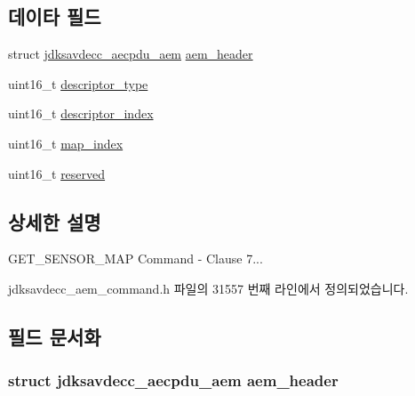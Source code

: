 \subsection*{데이타 필드}
\begin{DoxyCompactItemize}
\item 
struct \hyperlink{structjdksavdecc__aecpdu__aem}{jdksavdecc\+\_\+aecpdu\+\_\+aem} \hyperlink{structjdksavdecc__aem__command__get__sensor__map_ae1e77ccb75ff5021ad923221eab38294}{aem\+\_\+header}
\item 
uint16\+\_\+t \hyperlink{structjdksavdecc__aem__command__get__sensor__map_ab7c32b6c7131c13d4ea3b7ee2f09b78d}{descriptor\+\_\+type}
\item 
uint16\+\_\+t \hyperlink{structjdksavdecc__aem__command__get__sensor__map_a042bbc76d835b82d27c1932431ee38d4}{descriptor\+\_\+index}
\item 
uint16\+\_\+t \hyperlink{structjdksavdecc__aem__command__get__sensor__map_a3a5e0547986898ad64c07f238d8b7bcf}{map\+\_\+index}
\item 
uint16\+\_\+t \hyperlink{structjdksavdecc__aem__command__get__sensor__map_a5a6ed8c04a3db86066924b1a1bf4dad3}{reserved}
\end{DoxyCompactItemize}


\subsection{상세한 설명}
G\+E\+T\+\_\+\+S\+E\+N\+S\+O\+R\+\_\+\+M\+AP Command -\/ Clause 7... 

jdksavdecc\+\_\+aem\+\_\+command.\+h 파일의 31557 번째 라인에서 정의되었습니다.



\subsection{필드 문서화}
\subsubsection[{\texorpdfstring{aem\+\_\+header}{aem_header}}]{\setlength{\rightskip}{0pt plus 5cm}struct {\bf jdksavdecc\+\_\+aecpdu\+\_\+aem} aem\+\_\+header}\hypertarget{structjdksavdecc__aem__command__get__sensor__map_ae1e77ccb75ff5021ad923221eab38294}{}\label{structjdksavdecc__aem__command__get__sensor__map_ae1e77ccb75ff5021ad923221eab38294}


